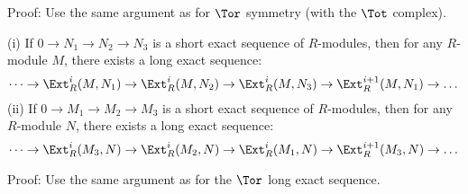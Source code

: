 \documentclass[10 pt]{article}
\newtheorem{cor}{Corollary}[section]
\newtheorem{lem}{Lemma}[section]
\newtheorem{prop}{Proposition}[section]
\newtheorem{propconstr}{Proposition-Construction}[section]
\newcommand\begin{lemma}{\begin{lem}}
\newcommand\begin{proposition}{\begin{prop}}
\newcommand\begin{proof}{\begin{proof}}
\newcommand\begin{corollary}{\begin{cor}}
\newcommand\begin{proposition}constr{\begin{propconstr}}
\newcommand\end{definition}{\end{defn}}
\newcommand\end{lemma}{\end{lem}}
\newcommand\end{corollary}{\end{cor}}
\newcommand\end{proposition}{\end{prop}}
\newcommand\end{proof}{\end{proof}}
\newcommand\end{proposition}constr{\end{propconstr}}
\begin{document}
Proof:  Use the same argument as for $\Tor$ symmetry (with the $\Tot$ complex).

\begin{proposition} (i) If $0\rightarrow N_1\rightarrow N_2\rightarrow N_3$ is a short exact sequence of $R$-modules, then for any $R$-module $M$, there exists a long exact sequence: 
$$\dots\rightarrow \Ext^i_R(M,N_1)\rightarrow \Ext^i_R(M,N_2)\rightarrow \Ext^i_R(M,N_3)\rightarrow \Ext^{i+1}_R(M,N_1)\rightarrow\dots$$
(ii) If $0\rightarrow M_1\rightarrow M_2\rightarrow M_3$ is a short exact sequence of $R$-modules, then for any $R$-module $N$, there exists a long exact sequence:
$$\dots\rightarrow \Ext^i_R(M_3,N)\rightarrow \Ext^i_R(M_2,N)\rightarrow \Ext^i_R(M_1,N)\rightarrow \Ext^{i+1}_R(M_3,N)\rightarrow\dots$$
\end{proposition}

Proof: Use the same argument as for the $\Tor$ long exact sequence.
\end{document}
